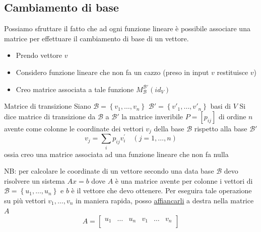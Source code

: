 \subsection{Cambiamento di base}
Possiamo sfruttare il fatto che ad ogni funzione lineare è possibile associare una matrice per effettuare il cambiamento di base di un vettore.
\begin{itemize}
	\item Prendo vettore $ v $
	\item Considero funzione lineare che non fa un cazzo (preso in input $ v $ restituisce $ v $)
	\item Creo matrice associata a tale funzione $ M_\mathcal{B}^{\mathcal{B}'}\left( id_V \right)  $
\end{itemize}
\begin{definizione}{Matrice di transizione}
	Siano $  \mathcal{B} = \left\{ v_1,\ldots,v_n \right\} $ $ \mathcal{B}' = \left\{ v'_1,\ldots, v'_n \right\}  $ basi di $ V $
	Si dice matrice di transizione da $  \mathcal{B} $ a $ \mathcal{B}' $ la matrice inveribile $ P=\left[ p_{ij} \right]  $ di ordine $ n $ avente come colonne le coordinate dei vettori $  v_j $ della base $ \mathcal{B} $ rispetto alla base $ \mathcal{B}' $
	\[
		v_j=\sum_i p_{i j} v_i^{\prime} \quad(j=1, \ldots, n)
	\]
	ossia creo una matrice associata ad una funzione lineare che non fa nulla
\end{definizione}
NB: per calcolare le coordinate di un vettore secondo una data base $ \mathcal{B} $ devo risolvere un sistema $ Ax=b $ dove $ A $ è una matrice avente per colonne i vettori di $ \mathcal{B}  = \left\{ u_1,\ldots,u_n \right\} $ e $ b $ è il vettore che devo ottenere.
\vskip3mm
Per eseguira tale operazione su più vettori $ v_1,\ldots,v_n $ in maniera rapida, posso \underline{affiancarli} a destra nella matrice $ A $
\[
	A =
	\begin{bmatrix}
		u_1 & \ldots & u_n & v_1 & \ldots & v_n \\
	\end{bmatrix}
\]

